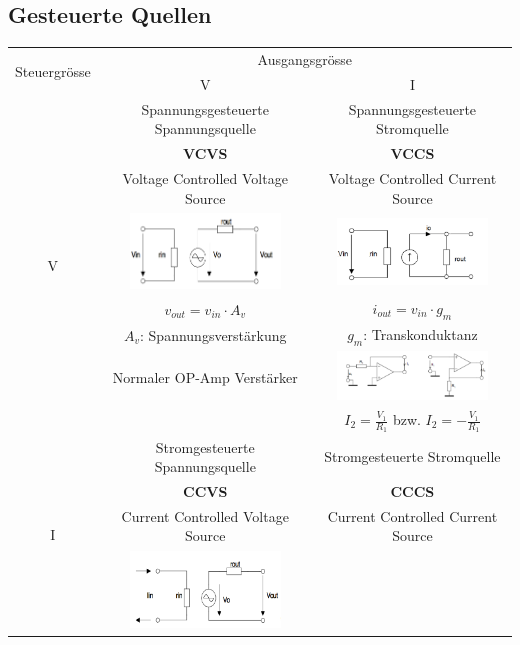     \subsection{Gesteuerte Quellen}
			\begin{tabular}{|c|c|c|}
				\hline
				\multirow{2}{*}{Steuergrösse} & \multicolumn{2}{c|}{Ausgangsgrösse}\\ \cline{2-3}
				& V & I \\ \hline
				\multirow{8}{*}{V}	& Spannungsgesteuerte Spannungsquelle	& Spannungsgesteuerte Stromquelle		\\
									& \bf{VCVS}								& \bf{VCCS}								\\
									& Voltage Controlled Voltage Source		& Voltage Controlled Current Source		\\ \cline{2-3}
									& \includegraphics[width=4cm,trim=0 0 0 -5]{./images/vcvs.png}	
									& \includegraphics[width=4cm,trim=0 0 0 -5]{./images/vccs.png}					\\ \cline{2-3}
									& $v_{out}=v_{in} \cdot A_v$			& $i_{out} = v_{in} \cdot g_m$			\\
									& $A_v$: Spannungsverstärkung			& $g_m$: Transkonduktanz				\\ \cline{2-3}
									& Normaler OP-Amp Verstärker
									& \includegraphics[width=4cm,trim=0 0 0 -7]{./images/vccs_schaltung.png}		\\
									&	& $I_2=\frac{V_1}{R_1}$ bzw. $I_2=-\frac{V_1}{R_1}$							\\ 	\hline	
				\multirow{8}{*}{I}	& Stromgesteuerte Spannungsquelle		& Stromgesteuerte Stromquelle			\\
									& \bf{CCVS}								& \bf{CCCS}								\\
									& Current Controlled Voltage Source		& Current Controlled Current Source		\\ \cline{2-3}
									& \includegraphics[width=4cm,trim=0 0 0 -5]{./images/ccvs.png}	

\end{tabular}
